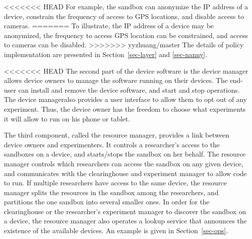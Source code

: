 {{%
<<<<<<< HEAD
For example, the sandbox can anonymize the IP address of a device, constrain  
the frequency of access to GPS locations, and disable
access to cameras. 
=======
To illustrate, the IP address of a device may be anonymized, 
the frequency to access GPS location can be constrained, and 
access to cameras can be disabled. 
>>>>>>> yyzhuang/master
The details of policy implementation are presented in 
Section~\ref{sec-layer} and \ref{sec-nanny}.

<<<<<<< HEAD
The second part of the device software is the device manager allows device owners to manage the 
software running on their devices. The end-user can install and remove
the device software, and start and stop operations. The device manageralso
provides a user interface to allow them to opt out of any 
experiment. Thus, the device owner has the freedom to choose what experiments it will allow to run on his phone or tablet.

The third component, called the resource manager, provides a link between device owners and experimenters. It controls a researcher's access to the sandboxes on a device, and
starts/stops the sandbox on her behalf. The resource manager controls which researchers 
can access the sandbox on any given device, and communicates with the clearinghouse
and experiment manager to allow code to run. If multiple researchers have access to 
the same device, the resource manager splits the resources in the sandbox among the researchers, and partitions the one sandbox into several smaller ones. In order for the clearinghouse or the researcher's experiment manager to discover the sandbox on a 
device, the resource manager also operates a lookup service that announces the existence of the available devices. An example is given in 
Section~\ref{sec-ops}.


}}
